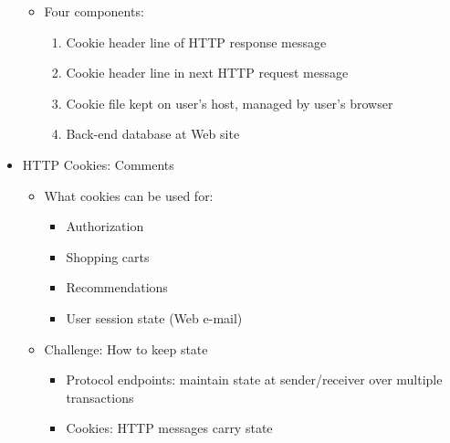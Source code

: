 \begin{itemize}
\begin{itemize}
      \item Four components:

        \begin{enumerate}

          \item Cookie header line of HTTP response message

          \item Cookie header line in next HTTP request message

          \item Cookie file kept on user's host, managed by user's browser

          \item Back-end database at Web site

        \end{enumerate}

    \end{itemize}

  \item HTTP Cookies: Comments

    \begin{itemize}

      \item What cookies can be used for:

        \begin{itemize}

          \item Authorization

          \item Shopping carts

          \item Recommendations

          \item User session state (Web e-mail)

        \end{itemize}

      \item Challenge: How to keep state

        \begin{itemize}

          \item Protocol endpoints: maintain state at sender/receiver over multiple transactions

          \item Cookies: HTTP messages carry state

        \end{itemize}


\end{itemize}
\end{itemize}
